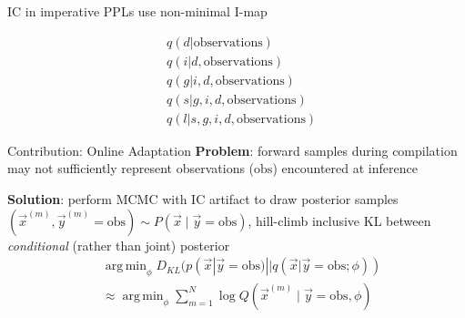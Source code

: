 \documentclass{beamer}
\DeclareMathOperator*{\argmin}{arg\,min}
\begin{document}
\begin{frame}[fragile]{IC in imperative PPLs use non-minimal I-map}
\begin{minipage}{0.4\linewidth}
\end{minipage}
\begin{minipage}{0.5\linewidth}
    \begin{align*}
        & q(d | \text{observations}) \\
        & q(i|d, \text{observations}) \\
        & q(g | i, d, \text{observations}) \\
        & q(s | g, i, d, \text{observations}) \\
        & q(l | s, g, i, d, \text{observations})
    \end{align*}
\end{minipage}
\end{frame}


\begin{frame}[fragile]{Contribution: Online Adaptation}
    \textbf{Problem}: forward samples during compilation may not sufficiently represent observations ($\text{obs}$) encountered at inference
    
    \textbf{Solution}: perform MCMC with IC artifact to draw posterior samples $(\vec{x}^{(m)}, \vec{y}^{(m)}=\text{obs}) \sim P(\vec{x} \mid \vec{y}=\text{obs})$,
    hill-climb inclusive KL between \emph{conditional} (rather than joint) posterior
    \begin{align*}
        &\argmin_{\phi} D_{KL}(p(\vec{x} | \vec{y}=\text{obs}) || q(\vec{x} | \vec{y}=\text{obs}; \phi)) \\
        &\approx 
        \argmin_{\phi} \sum_{m=1}^N \log Q(\vec{x}^{(m)} \mid \vec{y} = \text{obs}, \phi)
    \end{align*}
\end{frame}
\end{document}
